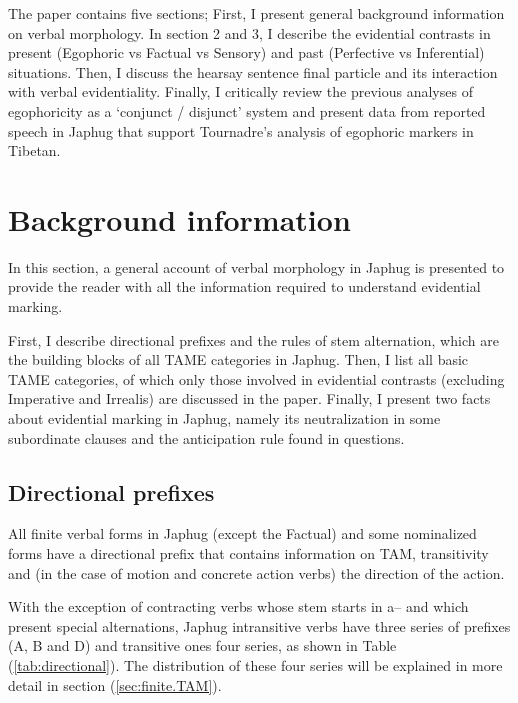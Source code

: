 \documentclass[oldfontcommands,oneside,a4paper,11pt]{article}
\newcommand{\ipa}[1]{{\phon \mbox{#1}}} %
\newcommand{\refb}[1]{(\ref{#1})}
\begin{document}
The paper contains five sections; First, I present general background information on verbal morphology. In section 2 and 3, I describe the evidential contrasts in present (Egophoric vs Factual vs Sensory) and past (Perfective vs Inferential) situations. Then, I discuss the hearsay sentence final particle and its interaction with verbal evidentiality. Finally, I critically review the previous analyses of egophoricity as a `conjunct / disjunct' system and present data from reported speech in Japhug that support Tournadre's \citeyearpar{tournadre08conjunct} analysis of egophoric markers in Tibetan.


\section{Background information}
In this section, a general account of verbal morphology in Japhug is presented to provide the reader with all the information required to understand evidential marking.

First, I describe directional prefixes and the rules of stem alternation, which are the building blocks of all TAME categories in Japhug. Then, I list all basic TAME categories, of which only those involved in evidential contrasts (excluding Imperative and Irrealis) are discussed in the paper. Finally, I present two facts about evidential marking in Japhug, namely its neutralization in some subordinate clauses and the anticipation rule found in questions.

\subsection{Directional prefixes} \label{sec:directional}
All finite verbal forms in Japhug (except the Factual) and some nominalized forms have a directional prefix that contains information on TAM, transitivity and  (in the case of motion and concrete action verbs) the direction of the action.

With the exception of contracting verbs whose stem starts in \ipa{a--} and which present special alternations, Japhug intransitive verbs have three series of prefixes (A, B and D) and transitive ones four series, as shown in Table \refb{tab:directional}. The distribution of these four series will be explained in more detail in section \refb{sec:finite.TAM}.
\end{document}
